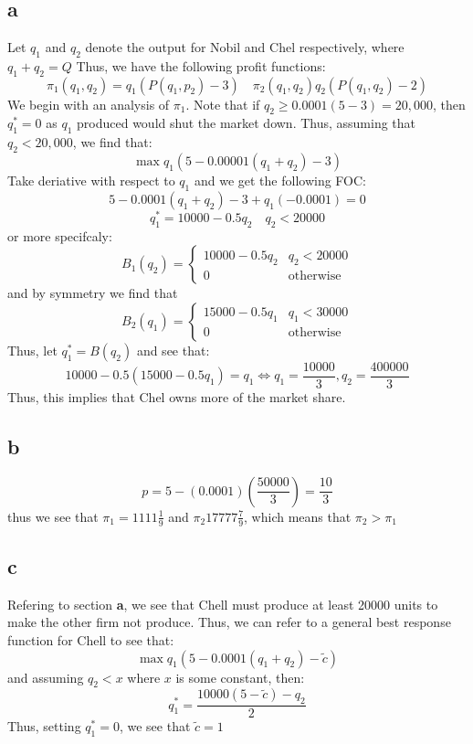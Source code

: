 \documentclass[11pt]{article}
\begin{document}
\section{}
\subsection*{a}
Let $q_1$ and $q_2$ denote the output for Nobil and Chel respectively, where $q_1 + q_2 = Q$ Thus, we have the following profit functions:
\[
\pi_1(q_1, q_2) = q_1(P(q_1, p_2) - 3) \quad \pi_2 (q_1, q_2) q_2(P(q_1,q_2) - 2)
\]
We begin with an analysis of $\pi_1$. Note that if $q_2 \geq 0.0001(5-3) = 20,000$, then $q_1^* = 0$ as $q_1$ produced would shut the market down. Thus, assuming that $q_2 < 20,000$,
we find that:
\[
\max q_1(5-0.00001(q_1 + q_2) - 3)
\]
Take deriative with respect to $q_1$ and we get the following FOC:
\[
5 - 0.0001(q_1 + q_2) - 3 + q_1(-0.0001) = 0
\]
\[
q_1^* = 10000 -0.5q_2 \quad q_2 < 20000
\]
or more specifcaly:
\[
B_1(q_2) = \begin{cases}
    10000 -0.5q_2 & q_2 < 20000\\
    0 & \text{otherwise}
\end{cases}
\]
and by symmetry we find that 
\[
B_2(q_1) = \begin{cases}
    15000 - 0.5q_1 & q_1 < 30000\\
    0 & \text{otherwise}
\end{cases}
\]
Thus, let $q_1^* = B(q_2)$ and see that:
\[
10000 -0.5(15000 -0.5q_1) = q_1 \iff q_1 = \frac{10000}{3}, q_2 = \frac{400000}{3}
\]
Thus, this implies that Chel owns more of the market share. 
\subsection*{b}
\[
p = 5 - (0.0001)\left( \frac{50000}{3} \right) = \frac{10}{3}
\]
thus we see that $\pi_1 = 1111 \frac{1}{9}$ and $\pi_2 17777\frac{7}{9}$, which means that $\pi_2 > \pi_1$
\subsection*{c}
Refering to section \textbf{a}, we see that Chell must produce at least 20000 units to make the other firm not produce. Thus, we can refer to a general best response function for Chell to see that:
\[
\max q_1(5-0.0001(q_1+q_2) - \tilde{c}) 
\]
and assuming $q_2 < x$ where $x$ is some constant, then:
\[
q_1^* = \frac{10000(5-\tilde{c}) - q_2}{2}
\]
Thus, setting $q_1^* = 0$, we see that $\tilde{c} = 1$
\end{document}
